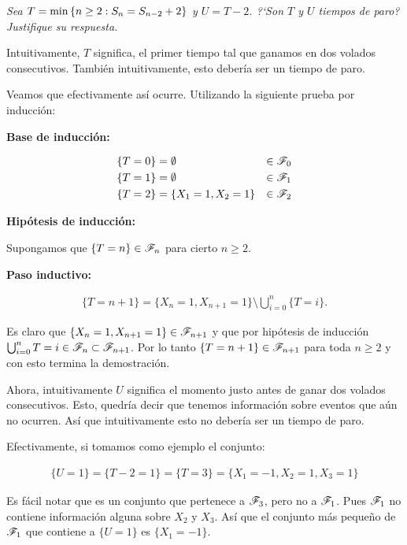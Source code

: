 \emph
{
	Sea $T=\min\left\{ n\geq 2:S_n=S_{n-2} + 2\right\} $ y $U=T-2$. ?`Son $T$ y $U$ 
	tiempos de paro? Justifique su respuesta.
}\pn

\afterstatement

	Intuitivamente, $T$ significa, el primer tiempo tal que ganamos en dos volados consecutivos.
	También intuitivamente, esto debería ser un tiempo de paro.\pn
	
	Veamos que efectivamente así ocurre. Utilizando la siguiente prueba por inducción:\pn
	
	\textbf{Base de inducción:}\pn		
    
		\begin{align}
			\{T = 0\} 		&= \emptyset  				& 	\in \mathscr{F}_0 \\
			\{T = 1\} 		&= \emptyset  				& 	\in \mathscr{F}_1 \\
			\{T = 2\} 		&= \{ X_1 = 1, X_2 = 1\} 	&	\in \mathscr{F}_2
		\end{align}\pn					
	
	\textbf{Hipótesis de inducción:}\pn
	
		Supongamos que $\{T = n\} \in \mathscr{F}_n$ para cierto $n \geq 2$.\pn
		
	\textbf{Paso inductivo:}\pn
		
		\begin{align}
			\{T = n + 1 \} = \{ X_n = 1, X_{n+1} = 1\} \setminus \bigcup_{i=0}^{n} \{T = i\}.
		\end{align}\pn				
	
		Es claro que $\{ X_n = 1, X_{n+1} = 1\} \in \mathscr{F}_{n + 1}$ y que por hipótesis de inducción
		$\bigcup_{i=0}^{n} {T = i} \in \mathscr{F}_n \subset \mathscr{F}_{n + 1}$. Por lo tanto
		$\{T = n + 1 \} \in \mathscr{F}_{n+1}$ para toda $n \geq 2$ y con esto termina la demostración.\pn
		
	Ahora, intuitivamente $U$ significa el momento justo antes de ganar dos volados consecutivos.
	Esto, quedría decir que tenemos información sobre eventos que aún no ocurren. Así que intuitivamente
	esto no debería ser un tiempo de paro.\pn
	
	Efectivamente, si tomamos como ejemplo el conjunto: 

    \begin{align}
        \{ U = 1 \} = \{ T - 2 = 1\} = \{ T = 3\} = \{X_1 = -1, X_2 = 1, X_3 = 1\}
    \end{align}\pn
			
	Es fácil notar que es un conjunto que pertenece a $\mathscr{F}_3$, pero no a $\mathscr{F}_1$. Pues $\mathscr{F}_1$
	no contiene información alguna sobre $X_2$ y $X_3$. Así que el conjunto más pequeño de $\mathscr{F}_1$ 
	que contiene a $\{ U = 1 \}$ es $\{ X_1 = -1 \}$.